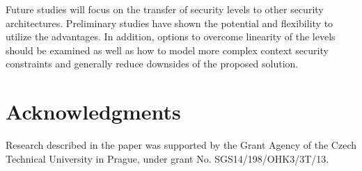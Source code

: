 \documentclass{sig-alternate}
\begin{document}
Future studies will focus on the transfer of security levels to other security architectures. Preliminary studies have shown the potential and flexibility to utilize the advantages. In addition, options to overcome linearity of the levels should be examined as well as how to model more complex context security constraints and generally reduce downsides of the proposed solution.

\section{Acknowledgments}
Research described in the paper was supported by the
Grant Agency of the Czech Technical University in Prague, under grant No. SGS14/198/OHK3/3T/13.

%

%
%
\end{document}
